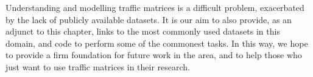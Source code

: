 Understanding and modelling traffic matrices is a difficult problem, exacerbated by the lack of
publicly available datasets. It is our aim to also provide, as an adjunct to this chapter, links
to the most commonly used datasets in this domain, and code to perform
some of the commonest tasks. In this way, we hope to provide a firm
foundation for future work in the area, and to help those who just
want to use traffic matrices in their research.

